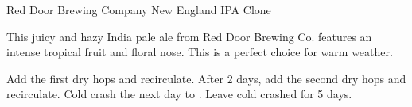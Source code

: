 \begin{recipie}{Red Door Brewing Company New England IPA Clone}

\begin{aboutblock}
This juicy and hazy India pale ale from Red Door Brewing Co. features an intense
tropical fruit and floral nose. This is a perfect choice for warm weather.
\sourceaha
\end{aboutblock}


\begin{methodandtiming}
 
\begin{mashsteps}
\end{mashsteps}

\begin{fermentationsteps}
\end{fermentationsteps}

\begin{directions}
Add the first dry hops and recirculate. After 2 days, add the second dry hops
and recirculate. Cold crash the next day to . Leave cold crashed
for 5 days.
\end{directions}

\end{methodandtiming}

\pagebreak

\begin{ingredientsblock}

\begin{malts}
\end{malts}

\begin{hops}
\end{hops}


\end{ingredientsblock}

\end{recipie}

